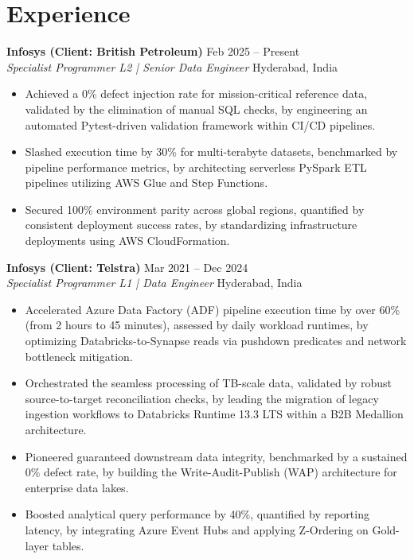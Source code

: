 \documentclass[10pt, letterpaper]{article}
\begin{document}
\section{Experience}

\noindent \textbf{Infosys (Client: British Petroleum)} \hfill Feb 2025 -- Present \\
\textit{Specialist Programmer L2 | Senior Data Engineer} \hfill Hyderabad, India
\begin{itemize}[leftmargin=0.25in, itemsep=1pt]
    \item Achieved a 0\% defect injection rate for mission-critical reference data, validated by the elimination of manual SQL checks, by engineering an automated Pytest-driven validation framework within CI/CD pipelines.
    \item Slashed execution time by 30\% for multi-terabyte datasets, benchmarked by pipeline performance metrics, by architecting serverless PySpark ETL pipelines utilizing AWS Glue and Step Functions.
    \item Secured 100\% environment parity across global regions, quantified by consistent deployment success rates, by standardizing infrastructure deployments using AWS CloudFormation.
\end{itemize}

\vspace{4pt}

\noindent \textbf{Infosys (Client: Telstra)} \hfill Mar 2021 -- Dec 2024 \\
\textit{Specialist Programmer L1 | Data Engineer} \hfill Hyderabad, India
\begin{itemize}[leftmargin=0.25in, itemsep=1pt]
    \item Accelerated Azure Data Factory (ADF) pipeline execution time by over 60\% (from 2 hours to 45 minutes), assessed by daily workload runtimes, by optimizing Databricks-to-Synapse reads via pushdown predicates and network bottleneck mitigation.
    \item Orchestrated the seamless processing of TB-scale data, validated by robust source-to-target reconciliation checks, by leading the migration of legacy ingestion workflows to Databricks Runtime 13.3 LTS within a B2B Medallion architecture.
    \item Pioneered guaranteed downstream data integrity, benchmarked by a sustained 0\% defect rate, by building the Write-Audit-Publish (WAP) architecture for enterprise data lakes.
    \item Boosted analytical query performance by 40\%, quantified by reporting latency, by integrating Azure Event Hubs and applying Z-Ordering on Gold-layer tables.
\end{itemize}
\end{document}
